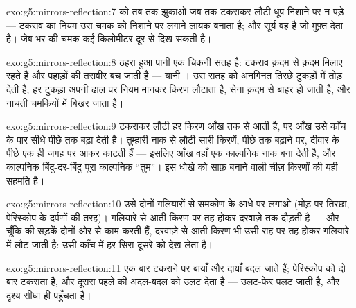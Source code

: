 \begin{solution}{exo:g5:mirrors-reflection:7}
 को तब तक झुकाओ जब तक टकराकर लौटी धूप निशाने पर न पड़े ---
टकराव का नियम उस चमक को निशाने पर लगाने लायक बनाता है; और सूर्य वह
 है जो  मुफ़्त देता है। जेब भर की चमक कई किलोमीटर दूर
से दिख सकती है।
\end{solution}

\begin{solution}{exo:g5:mirrors-reflection:8}
ठहरा हुआ पानी एक चिकनी सतह है: टकराव क़दम से क़दम मिलाए रहते हैं और
पहाड़ों की तसवीर बच जाती है --- यानी ।  उस सतह को अनगिनत तिरछे
टुकड़ों में तोड़ देती है; हर टुकड़ा अपनी ढाल पर नियम मानकर किरण लौटाता
है, सेना क़दम से बाहर हो जाती है, और  नाचती चमकियों में बिखर
जाता है।
\end{solution}

\begin{solution}{exo:g5:mirrors-reflection:9}
टकराकर लौटी हर किरण आँख तक  से आती है, पर आँख उसे काँच के पार
सीधे पीछे तक बढ़ा देती है। तुम्हारी नाक से लौटी सारी किरणें, पीछे तक
बढ़ाने पर, दीवार के पीछे एक ही जगह पर आकर काटती हैं --- इसलिए आँख
वहाँ एक काल्पनिक नाक बना देती है, और काल्पनिक बिंदु-दर-बिंदु पूरा
काल्पनिक ``तुम''। इस धोखे को साफ़ बनाने वाली चीज़ किरणों की यही सहमति
है।
\end{solution}

\begin{solution}{exo:g5:mirrors-reflection:10}
उसे दोनों गलियारों से समकोण के आधे पर लगाओ (मोड़ पर तिरछा,
पेरिस्कोप के दर्पणों की तरह)। गलियारे से आती किरण  पर तह होकर
दरवाज़े तक दौड़ती है --- और चूँकि  की सड़कें दोनों ओर से काम
करती हैं, दरवाज़े से आती किरण भी उसी राह पर तह होकर गलियारे में लौट
जाती है: उसी काँच में हर सिरा दूसरे को देख लेता है।
\end{solution}

\begin{solution}{exo:g5:mirrors-reflection:11}
एक बार टकराने पर बायाँ और दायाँ बदल जाते हैं; पेरिस्कोप  को दो
बार टकराता है, और दूसरा  पहले  की अदल-बदल को उलट देता है ---
उलट-फेर पलट जाती है, और दृश्य सीधा ही पहुँचता है।
\end{solution}
